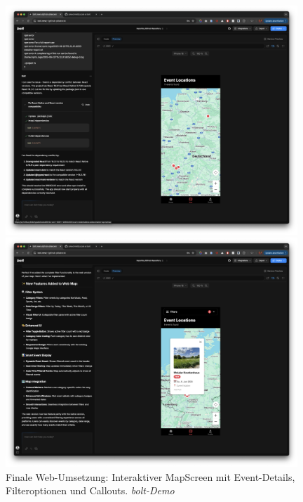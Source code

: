 \begin{figure}[htbp]
      \centering
      \begin{minipage}{0.48\textwidth}
            \centering
            \includegraphics[width=0.98\textwidth]{images/bolt_screenshots/funktionierender map screen.png}
      \end{minipage}
      \hfill
      \begin{minipage}{0.48\textwidth}
            \centering
            \includegraphics[width=0.98\textwidth]{images/bolt_screenshots/funktionierender map screen + callout & filter angewendet.png}
      \end{minipage}
      \caption{Finale Web-Umsetzung: Interaktiver MapScreen mit Event-Details, Filteroptionen und Callouts. \textit{bolt-Demo}}
      \label{fig:bolt-final}
\end{figure}


